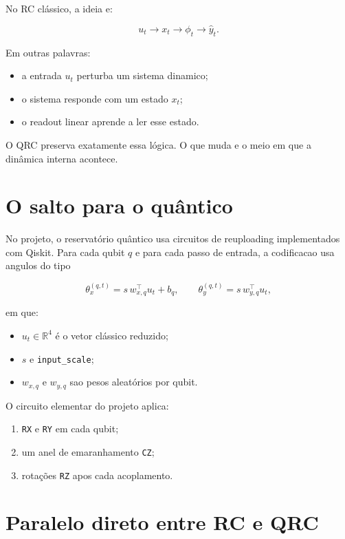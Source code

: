 \documentclass[12pt]{article}
\providecommand{\tightlist}{%
          \setlength{\itemsep}{0pt}\setlength{\parskip}{0pt}}
\begin{document}
No RC clássico, a ideia e:

\[
u_t \longrightarrow x_t \longrightarrow \phi_t \longrightarrow \hat{y}_t.
\]

Em outras palavras:

\begin{itemize}
\tightlist
\item
  a entrada \(u_t\) perturba um sistema dinamico;
\item
  o sistema responde com um estado \(x_t\);
\item
  o readout linear aprende a ler esse estado.
\end{itemize}

O QRC preserva exatamente essa lógica. O que muda e o meio em que a dinâmica interna acontece.

\section{O salto para o quântico}\label{3-o-salto-para-o-quuxe2ntico}

No projeto, o reservatório quântico usa circuitos de reuploading implementados com Qiskit. Para cada qubit \(q\) e para cada passo de entrada, a codificacao usa angulos do tipo

\[
\theta^{(q,t)}_x = s \, w_{x,q}^\top u_t + b_q,
\qquad
\theta^{(q,t)}_y = s \, w_{y,q}^\top u_t,
\]

em que:

\begin{itemize}
\tightlist
\item
  \(u_t \in \mathbb{R}^4\) é o vetor clássico reduzido;
\item
  \(s\) e \texttt{input\_scale};
\item
  \(w_{x,q}\) e \(w_{y,q}\) sao pesos aleatórios por qubit.
\end{itemize}

O circuito elementar do projeto aplica:

\begin{enumerate}
\def\labelenumi{\arabic{enumi}.}
\tightlist
\item
  \texttt{RX} e \texttt{RY} em cada qubit;
\item
  um anel de emaranhamento \texttt{CZ};
\item
  rotações \texttt{RZ} apos cada acoplamento.
\end{enumerate}

\section{Paralelo direto entre RC e QRC}\label{4-paralelo-direto-entre-rc-e-qrc}
\end{document}
